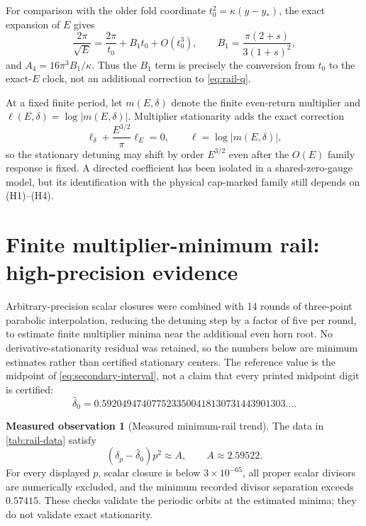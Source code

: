 \documentclass[11pt]{article}
\theoremstyle{definition}
\newtheorem{observation}[theorem]{Measured observation}
\theoremstyle{remark}
\begin{document}
For comparison with the older fold coordinate $t_0^2=\kappa(y-y_*)$, the exact expansion of $E$ gives
\begin{equation}
  \frac{2\pi}{\sqrt E}=\frac{2\pi}{t_0}+B_1t_0+O(t_0^3),
  \qquad
  B_1=\frac{\pi(2+s)}{3(1+s)^2},
\end{equation}
and $A_4=16\pi^3B_1/\kappa$.  Thus the $B_1$ term is precisely the conversion from $t_0$ to the exact-$E$ clock, not an additional correction to \cref{eq:rail-q}.

At a fixed finite period, let $m(E,\delta)$ denote the finite even-return multiplier and $\ell(E,\delta)=\log|m(E,\delta)|$.  Multiplier stationarity adds the exact correction
\begin{equation}
  \ell_\delta+\frac{E^{3/2}}{\pi}\ell_E=0,
  \qquad \ell=\log|m(E,\delta)|,
  \label{eq:stationary-correction}
\end{equation}
so the stationary detuning may shift by order $E^{3/2}$ even after the $O(E)$ family response is fixed.  A directed coefficient has been isolated in a shared-zero-gauge model, but its identification with the physical cap-marked family still depends on (H1)--(H4).

\section{Finite multiplier-minimum rail: high-precision evidence}

Arbitrary-precision scalar closures were combined with 14 rounds of three-point parabolic interpolation, reducing the detuning step by a factor of five per round, to estimate finite multiplier minima near the additional even horn root.  No derivative-stationarity residual was retained, so the numbers below are minimum estimates rather than certified stationary centers.  The reference value is the midpoint of \cref{eq:secondary-interval}, not a claim that every printed midpoint digit is certified:
\[
  \widehat\delta_0
  =0.5920494740775233500418130731443901303\ldots.
\]

\begin{observation}[Measured minimum-rail trend]\label{obs:stationary-rail}
The data in \cref{tab:rail-data} satisfy
\begin{equation}
  (\delta_p-\widehat\delta_0)p^2\approx A,
  \qquad A\approx2.59522.
\label{eq:delta-convergence}
\end{equation}
For every displayed $p$, scalar closure is below $3\times10^{-65}$, all proper scalar divisors are numerically excluded, and the minimum recorded divisor separation exceeds $0.57415$.  These checks validate the periodic orbits at the estimated minima; they do not validate exact stationarity.
\end{observation}
\end{document}
